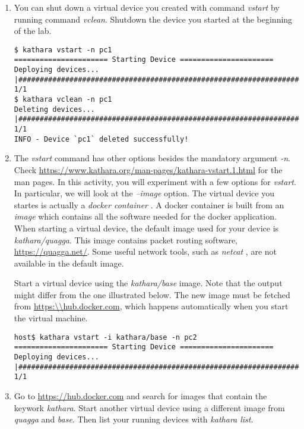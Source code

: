 \documentclass[12pt]{book}
\begin{document}
\begin{enumerate}[{Activity }1)]
\item You can shut down a virtual device you created with command \emph{vstart} by running command \emph{vclean}. Shutdown the device you started at the beginning of the lab.

\begin{verbatim}
$ kathara vstart -n pc1
====================== Starting Device ======================
Deploying devices... |##############################################################################| 1/1
$ kathara vclean -n pc1
Deleting devices... |###############################################################################| 1/1
INFO - Device `pc1` deleted successfully!
\end{verbatim}

\item The \emph{vstart} command has other options besides the mandatory argument \emph{-n}. Check \url{https://www.kathara.org/man-pages/kathara-vstart.1.html} for the man pages. In this activity, you will experiment with a few options for \emph{vstart}. In particular, we will look at the \emph{--image} option. The virtual device you startes is actually a \emph{docker container} \cite{docker-useful}. A docker container is built from an \emph{image} which contains all the software needed for the docker application. When starting a virtual device, the default image used for your device is \emph{kathara/quagga}. This image contains packet routing software, \url{https://quagga.net/}. Some useful network tools, such as \emph{netcat} \cite{netcat}, are not available in the default image.

  Start a virtual device using the \emph{kathara/base} image. Note that the output might differ from the one illustrated below. The new image must be fetched from \url{https:\\hub.docker.com}, which happens automatically when you start the virtual machine.

\begin{verbatim}
host$ kathara vstart -i kathara/base -n pc2
====================== Starting Device ======================
Deploying devices... |#######################################################################################| 1/1
\end{verbatim}

\item Go to \url{https://hub.docker.com} and search for images that contain the keywork \emph{kathara}. Start another virtual device using a different image from \emph{quagga} and \emph{base}. Then list your running devices with \emph{kathara list}.


\end{enumerate}
\end{document}
